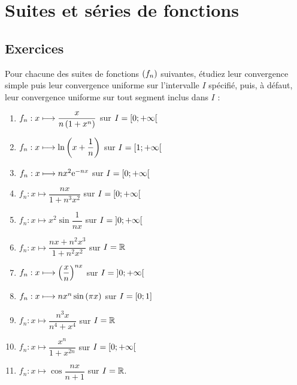 \chapter{Suites et séries de fonctions}

\minitoc

\section*{Exercices}

\legendeexercices

\begin{exoss}
Pour chacune des suites de fonctions \(\left(f_n\right)\) suivantes, étudiez leur convergence simple puis leur convergence uniforme sur l'intervalle \(I\) spécifié, puis, à défaut, leur convergence uniforme sur tout segment inclus dans \(I\) :

\begin{enumerate}
    \item \(f_n:x\longmapsto\dfrac{x}{n\left(1+x^n\right)}\) sur \(I=\left[0;+\infty\right[\) \\
    \item \(f_n:x\longmapsto\ln\left(x+\dfrac{1}{n}\right)\) sur \(I=\left[1;+\infty\right[\) \\
    \item \(f_n:x\longmapsto nx^2\mathrm{e}^{-nx}\) sur \(I=\left[0;+\infty\right[\) \\
    \item \(f_n:x\mapsto\dfrac{nx}{1+n^3x^2}\) sur \(I=\left[0;+\infty\right[\) \\
    \item \(f_n:x\mapsto x^2\sin\dfrac{1}{nx}\) sur \(I=\left]0;+\infty\right[\) \\
    \item \(f_n:x\mapsto\dfrac{nx+n^2x^3}{1+n^2x^2}\) sur \(I=\mathbb{R}\) \\
    \item \(f_n:x\longmapsto\left(\dfrac{x}{n}\right)^{nx}\) sur \(I=\left]0;+\infty\right[\) \\
    \item \(f_n:x\longmapsto nx^n\sin\left(\pi x\right)\) sur \(I=\left[0;1\right]\) \\
    \item \(f_n:x\mapsto\dfrac{n^3x}{n^4+x^4}\) sur \(I=\mathbb{R}\) \\
    \item \(f_n:x\mapsto\dfrac{x^n}{1+x^{2n}}\) sur \(I=\left[0;+\infty\right[\) \\
    \item \(f_n:x\mapsto\cos\dfrac{nx}{n+1}\) sur \(I=\mathbb{R}\).
\end{enumerate}
\end{exoss}

